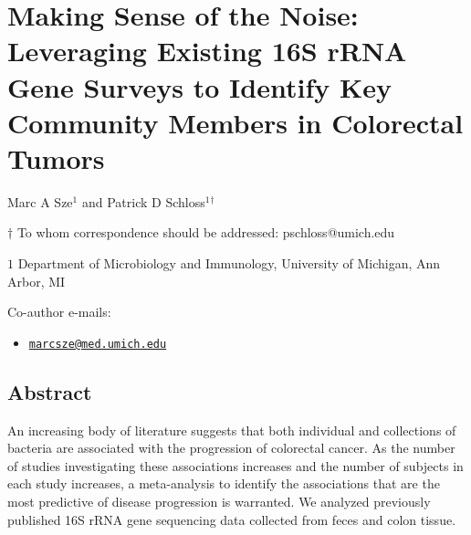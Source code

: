 \documentclass[12pt,]{article}
\title{}
\author{}
\date{}
\providecommand{\tightlist}{%
  \setlength{\itemsep}{0pt}\setlength{\parskip}{0pt}}
\begin{document}
\section{Making Sense of the Noise: Leveraging Existing 16S rRNA Gene
Surveys to Identify Key Community Members in Colorectal
Tumors}\label{making-sense-of-the-noise-leveraging-existing-16s-rrna-gene-surveys-to-identify-key-community-members-in-colorectal-tumors}

\begin{center}
\vspace{25mm}

Marc A Sze${^1}$ and Patrick D Schloss${^1}$${^\dagger}$

\vspace{20mm}

$\dagger$ To whom correspondence should be addressed: pschloss@umich.edu

$1$ Department of Microbiology and Immunology, University of Michigan, Ann Arbor, MI




\end{center}

Co-author e-mails:

\begin{itemize}
\tightlist
\item
  \href{mailto:marcsze@med.umich.edu}{\nolinkurl{marcsze@med.umich.edu}}
\end{itemize}

\newpage

\linenumbers

\subsection{Abstract}\label{abstract}

An increasing body of literature suggests that both individual and
collections of bacteria are associated with the progression of
colorectal cancer. As the number of studies investigating these
associations increases and the number of subjects in each study
increases, a meta-analysis to identify the associations that are the
most predictive of disease progression is warranted. We analyzed
previously published 16S rRNA gene sequencing data collected from feces
and colon tissue.
\end{document}
